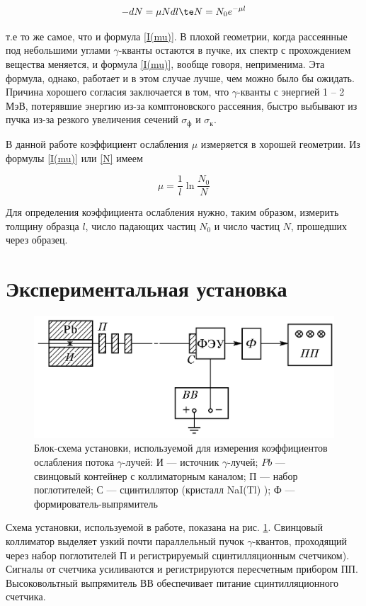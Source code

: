 \documentclass[12pt]{kiarticle}
\newcommand{\ga}{\ensuremath{\gamma}}
\begin{document}
	\begin{equation}\label{N}
	-dN = \mu N dl \te N = N_0 e^{-\mu l}
	\end{equation}
	
	т.е то же самое, что и формула \eqref{I(mu)}. В плохой геометрии, когда рассеянные под небольшими углами
	\ga-кванты остаются в пучке, их спектр с прохождением вещества меняется, и формула \eqref{I(mu)}, вообще говоря, неприменима. Эта формула, однако, работает и в этом случае лучше, чем можно было бы ожидать. Причина хорошего согласия заключается в том, что \ga-кванты с энергией 1 -- 2 МэВ, потерявшие энергию из-за комптоновского рассеяния,
	быстро выбывают из пучка из-за резкого увеличения сечений $ \sigma_ф $ и $ \sigma_к $.
	
	В данной работе коэффициент ослабления $ \mu $ измеряется в хорошей
	геометрии. Из формулы \eqref{I(mu)} или \eqref{N} имеем
	
	\begin{equation}\label{mu}
	\mu = \dfrac{1}{l} \ln{\dfrac{N_0}{N}}
	\end{equation}
	
	Для определения коэффициента ослабления нужно, таким образом, измерить толщину образца $ l $, число падающих частиц $ N_0 $ и число
	частиц $ N $, прошедших через образец.
	
	\section{Экспериментальная установка}
	
		\begin{figure}[h!]
		\centering
		\includegraphics[width=0.7\linewidth]{lab}
		\caption{Блок-схема установки, используемой для измерения коэффициентов ослабления потока \ga-лучей: И --- источник \ga-лучей; $ Pb $ --- свинцовый контейнер с коллиматорным каналом; П --- набор поглотителей; С --- сцинтиллятор (кристалл
			NaI(Tl) ); Ф --- формирователь-выпрямитель}
		\label{ris lab}
	\end{figure}

Схема установки, используемой в работе, показана на рис. \ref{ris lab}. Свинцовый коллиматор выделяет узкий почти параллельный пучок \ga-квантов, проходящий через набор поглотителей П и регистрируемый сцинтилляционным счетчиком). Сигналы от счетчика усиливаются и регистрируются пересчетным прибором ПП. Высоковольтный выпрямитель ВВ обеспечивает питание сцинтилляционного счетчика.
\end{document}
